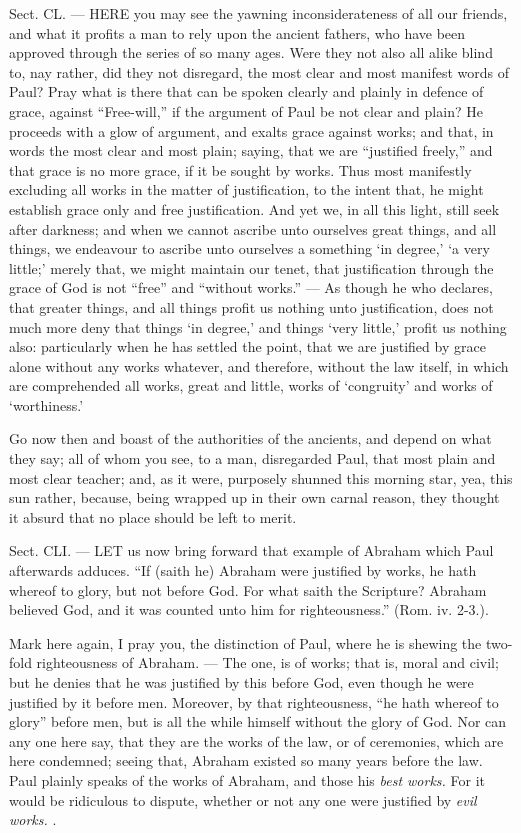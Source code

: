 Sect. CL. — HERE you may see the yawning inconsiderateness of all our friends, and what it profits a man to rely upon the ancient fathers, who have been approved through the series of so many ages. Were they not also all alike blind to, nay rather, did they not disregard, the most clear and most manifest words of Paul? Pray what is there that can be spoken clearly and plainly in defence of grace, against “Free-will,” if the argument of Paul be not clear and plain? He proceeds with a glow of argument, and exalts grace against works; and that, in words the most clear and most plain; saying, that we are “justified freely,” and that grace is no more grace, if it be sought by works. Thus most manifestly excluding all works in the matter of justification, to the intent that, he might establish grace only and free justification. And yet we, in all this light, still seek after darkness; and when we cannot ascribe unto ourselves great things, and all things, we endeavour to ascribe unto ourselves a something ‘in degree,’ ‘a very little;’ merely that, we might maintain our tenet, that justification through the grace of God is not “free” and “without works.” — As though he who declares, that greater things, and all things profit us nothing unto justification, does not much more deny that things ‘in degree,’ and things ‘very little,’ profit us nothing also: particularly when he has settled the point, that we are justified by grace alone without any works whatever, and therefore, without the law itself, in which are comprehended all works, great and little, works of ‘congruity’ and works of ‘worthiness.’

Go now then and boast of the authorities of the ancients, and depend on what they say; all of whom you see, to a man, disregarded Paul, that most plain and most clear teacher; and, as it were, purposely shunned this morning star, yea, this sun rather, because, being wrapped up in their own carnal reason, they thought it absurd that no place should be left to merit.


Sect. CLI. — LET us now bring forward that example of Abraham which Paul afterwards adduces. “If (saith he) Abraham were justified by works, he hath whereof to glory, but not before God. For what saith the Scripture? Abraham believed God, and it was counted unto him for righteousness.” (Rom. iv. 2-3.).

Mark here again, I pray you, the distinction of Paul, where he is shewing the two-fold righteousness of Abraham. — The one, is of works; that is, moral and civil; but he denies that he was justified by this before God, even though he were justified by it before men. Moreover, by that righteousness, “he hath whereof to glory” before men, but is all the while himself without the glory of God. Nor can any one here say, that they are the works of the law, or of ceremonies, which are here condemned; seeing that, Abraham existed so many years before the law. Paul plainly speaks of the works of Abraham, and those his \emph{best works. }For it would be ridiculous to dispute, whether or not any one were justified by \emph{evil works.} .

